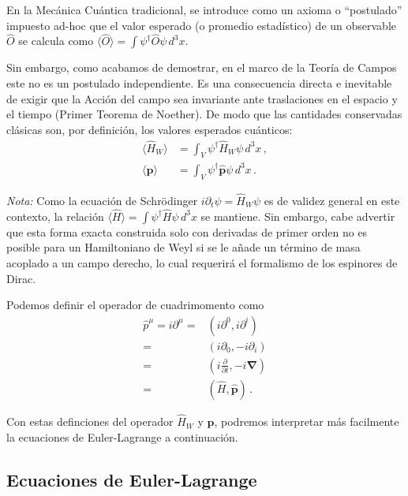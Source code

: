 \begin{frame}
En la Mecánica Cuántica tradicional, se introduce como un axioma o ``postulado'' impuesto ad-hoc que el valor esperado (o promedio estadístico) de un observable $\hat{O}$ se calcula como $\langle \hat{O} \rangle = \int \psi^\dagger \hat{O} \psi \, d^3x$. 

Sin embargo, como acabamos de demostrar, en el marco de la Teoría de Campos este no es un postulado independiente. Es una consecuencia directa e inevitable de exigir que la Acción del campo sea invariante ante traslaciones en el espacio y el tiempo (Primer Teorema de Noether). De modo que las cantidades conservadas clásicas son, por definición, los valores esperados cuánticos:
\begin{align}
    \langle \hat{H}_W \rangle &= \int_V \psi^\dagger \hat{H}_W \psi \, d^3x \, , \\
    \langle \mathbf{\hat{p}} \rangle &= \int_V \psi^\dagger \mathbf{\hat{p}} \psi \, d^3x \, .
\end{align}

\textit{Nota:} Como la ecuación de Schrödinger $i\partial_t \psi = \hat{H}_W \psi$ es de validez general en este contexto, la relación $\langle \hat{H} \rangle = \int \psi^\dagger \hat{H} \psi \, d^3x$ se mantiene. Sin embargo, cabe advertir que esta forma exacta construida solo con derivadas de primer orden no es posible para un Hamiltoniano de Weyl si se le añade un término de masa acoplado a un campo derecho, lo cual requerirá el formalismo de los espinores de Dirac.

Podemos definir el operador de cuadrimomento como
\begin{align}
  \label{eq:cuadrimomentum}
  \hat{p}^\mu = i\partial^\mu =& \left(i\partial^0,i\partial^i\right)\nonumber\\
  =& \left(i\partial_0,-i\partial_i\right)\nonumber\\
  =& \left(i\frac{\partial}{\partial t},-i \boldsymbol{\nabla}\right)\nonumber\\
   =& \left(\hat{H},\hat{\boldsymbol{p}}\right)\,.
\end{align}


Con estas definciones del operador $\hat{H}_W$ y $\hat{\boldsymbol{p}}$, podremos interpretar más facilmente la ecuaciones de Euler-Lagrange a continuación.
\end{frame}



\subsection{Ecuaciones de Euler-Lagrange}
\label{sec:ecuaciones-de-euler}

